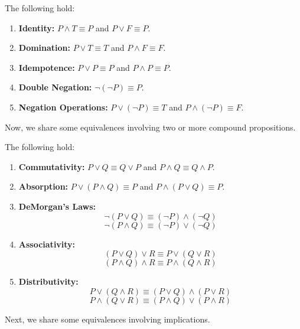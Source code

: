         \begin{theorem}\label{thm:eqlogforms}
            The following hold:
            \begin{enumerate}
                \item \textbf{Identity:} $P \land T \equiv P$ and $P \lor F \equiv P$.
                \item \textbf{Domination:} $P \lor T \equiv T$ and $P \land F \equiv F$.
                \item \textbf{Idempotence:} $P \lor P \equiv P$ and $P \land P \equiv P$.
                \item \textbf{Double Negation:} $\neg(\neg P) \equiv P$.
                \item \textbf{Negation Operations:} $P \lor (\neg P) \equiv T$ and $P \land (\neg P) \equiv F$.
            \end{enumerate}
        \end{theorem}

        Now, we share some equivalences involving two or more compound propositions.

        \begin{theorem}\label{thm:eqlogforms2}
            The following hold:
            \begin{enumerate}
                 \item \textbf{Commutativity:} $P \lor Q \equiv Q \lor P$ and $P \land Q \equiv Q \land P$.
                \item \textbf{Absorption:} $P \lor (P \land Q) \equiv P$ and $P \land (P \lor Q) \equiv P$.
                \item \textbf{DeMorgan's Laws:} $$\neg(P \lor Q) \equiv (\neg P) \land (\neg Q)$$ $$\neg(P \land Q) \equiv (\neg P) \lor (\neg Q)$$
                \item \textbf{Associativity:} $$(P \lor Q) \lor R \equiv P \lor (Q \lor R)$$ $$(P \land Q) \land R \equiv P \land (Q \land R)$$
                \item \textbf{Distributivity:} $$P \lor (Q \land R) \equiv (P \lor Q) \land (P \lor R)$$ $$P \land (Q \lor R) \equiv (P \land Q) \lor (P \land R)$$
            \end{enumerate}
        \end{theorem}

        Next, we share some equivalences involving implications.

